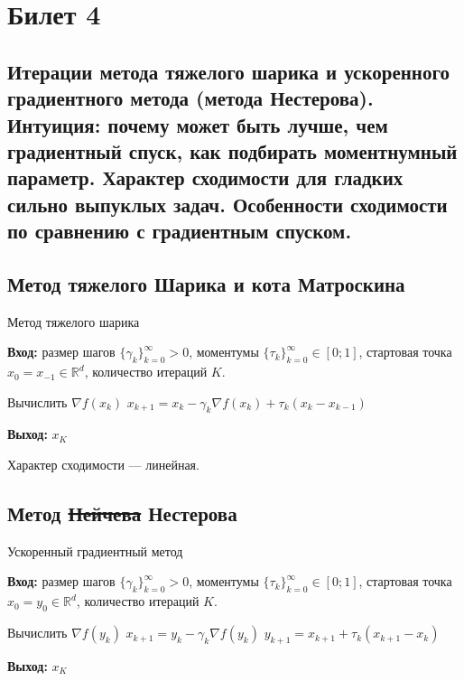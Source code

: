 \section{Билет 4}

\subsection{Итерации метода тяжелого шарика и ускоренного градиентного метода
    (метода Нестерова). Интуиция: почему может быть лучше, чем градиентный спуск, как подбирать моментнумный параметр.
    Характер сходимости для гладких сильно выпуклых задач. Особенности сходимости по
    сравнению с градиентным спуском.}

\subsection*{Метод тяжелого Шарика и кота Матроскина}

\begin{algorithm}[ht]
    \caption{Метод тяжелого шарика}
    \textbf{Вход:} размер шагов $\{\gamma_k\}_{k=0}^{\infty} > 0$, моментумы $\{\tau_k\}_{k=0}^{\infty} \in [0; 1]$, стартовая точка $x_0 = x_{-1} \in \mathbb{R}^d$, количество итераций $K$.
    \begin{algorithmic}[1]
        \State Вычислить $\nabla f(x_k)$
        \State $x_{k+1} = x_k - \gamma_k \nabla f(x_k) + \tau_k (x_k - x_{k-1})$
        \EndFor
    \end{algorithmic}
    \textbf{Выход:} $x_K$
\end{algorithm}

Характер сходимости --- линейная.

\subsection*{Метод \texorpdfstring{\sout{Нейчева}}{d} Нестерова}
\begin{algorithm}[ht]
    \caption{Ускоренный градиентный метод}
    \textbf{Вход:} размер шагов $\{\gamma_k\}_{k=0}^{\infty} > 0$, моментумы $\{\tau_k\}_{k=0}^{\infty} \in [0; 1]$, стартовая точка $x_0 = y_0 \in \mathbb{R}^d$, количество итераций $K$.
    \begin{algorithmic}[1]
        \State Вычислить $\nabla f(y_k)$
        \State $x_{k+1} = y_k - \gamma_k \nabla f(y_k)$
        \State $y_{k+1} = x_{k+1} + \tau_k (x_{k+1} - x_k)$
        \EndFor
    \end{algorithmic}
    \textbf{Выход:} $x_K$
\end{algorithm}

